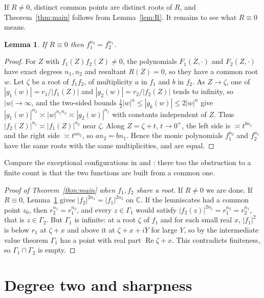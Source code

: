 \documentclass[11pt]{amsart}
\newtheorem{lemma}[theorem]{Lemma}
\theoremstyle{remark}\newtheorem{remark}[theorem]{Remark}
\theoremstyle{definition}\newtheorem{example}[theorem]{Example}
\newcommand{\C}{\mathbb{C}}
\begin{document}
If $R\ne0$, distinct common points are distinct roots of $R$, and Theorem~\ref{thm:main} follows from
Lemma~\ref{lem:R}. It remains to see what $R\equiv0$ means.

\begin{lemma}\label{lem:nested}
If $R\equiv0$ then $f_1^{n_2}=f_2^{n_1}$.
\end{lemma}

\begin{proof}
For $Z$ with $f_1(Z)f_2(Z)\ne0$, the polynomials $F_1(Z,\cdot)$ and $F_2(Z,\cdot)$ have exact degrees $n_1,n_2$ and
resultant $R(Z)=0$, so they have a common root $w$. Let $\zeta$ be a root of $f_1f_2$, of multiplicity $a$ in $f_1$
and $b$ in $f_2$. As $Z\to\zeta$, one of $|g_1(w)|=r_1/|f_1(Z)|$ and $|g_2(w)|=r_2/|f_2(Z)|$ tends to infinity, so
$|w|\to\infty$, and the two-sided bounds $\tfrac12|w|^{n}\le|g_k(w)|\le2|w|^{n}$ give
$|g_1(w)|^{n_2}\asymp|w|^{n_1n_2}\asymp|g_2(w)|^{n_1}$ with constants independent of $Z$. Thus
$|f_2(Z)|^{n_1}\asymp|f_1(Z)|^{n_2}$ near $\zeta$. Along $Z=\zeta+t$, $t\to0^+$, the left side is
$\asymp t^{bn_1}$ and the right side $\asymp t^{an_2}$, so $an_2=bn_1$. Hence the monic polynomials
$f_1^{n_2}$ and $f_2^{n_1}$ have the same roots with the same multiplicities, and are equal.
\end{proof}

Compare the exceptional configurations in \cite[Theorem~2.2]{ps} and \cite[Theorem~1.1]{op}: there too the
obstruction to a finite count is that the two functions are built from a common one.

\begin{proof}[Proof of Theorem~\ref{thm:main} when $f_1,f_2$ share a root]
If $R\ne0$ we are done. If $R\equiv0$, Lemma~\ref{lem:nested} gives $|f_2|^{2n_1}=|f_1|^{2n_2}$ on $\C$. If the
lemniscates had a common point $z_0$, then $r_2^{n_1}=r_1^{n_2}$, and every $z\in\Gamma_1$ would satisfy
$|f_2(z)|^{2n_1}=r_1^{n_2}=r_2^{n_1}$, that is $z\in\Gamma_2$. But $\Gamma_1$ is infinite: at a root $\zeta$ of $f_1$
and for each small real $x$, $|f_1|^2$ is below $r_1$ at $\zeta+x$ and above it at $\zeta+x+iY$ for large $Y$, so by
the intermediate value theorem $\Gamma_1$ has a point with real part $\operatorname{Re}\zeta+x$. This contradicts
finiteness, so $\Gamma_1\cap\Gamma_2$ is empty.
\end{proof}

\section{Degree two and sharpness}\label{sec:sharp}
\end{document}
